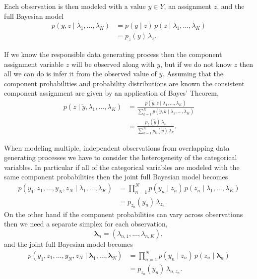 \documentclass[
  letterpaper,
  DIV=11,
  numbers=noendperiod]{scrartcl}
\begin{document}
Each observation is then modeled with a value \(y \in Y\), an assignment
\(z\), and the full Bayesian model \begin{align*}
p(y, z \mid \lambda_{1}, \ldots, \lambda_{K})
&=
p(y \mid z) \, p(z \mid \lambda_{1}, \ldots, \lambda_{K})
\\
&=
p_{z}(y) \, \lambda_{z}.
\end{align*}

If we know the responsible data generating process then the component
assignment variable \(z\) will be observed along with \(y\), but if we
do not know \(z\) then all we can do is infer it from the observed value
of \(y\). Assuming that the component probabilities and probability
distributions are known the consistent component assignment are given by
an application of Bayes' Theorem, \begin{align*}
p(z \mid \tilde{y}, \lambda_{1}, \ldots, \lambda_{K})
&=
\frac{
  p(\tilde{y}, z \mid \lambda_{1}, \ldots, \lambda_{K})
}{
  \sum_{k = 1}^{K} p(\tilde{y}, k \mid \lambda_{1}, \ldots, \lambda_{K})
}
\\
&=
\frac{ p_{z}(\tilde{y}) \, \lambda_{z}}
{ \sum_{k = 1}^{K} p_{k}(\tilde{y}) \, \lambda_{k} }.
\end{align*}

When modeling multiple, independent observations from overlapping data
generating processes we have to consider the heterogeneity of the
categorical variables. In particular if all of the categorical variables
are modeled with the same component probabilities then the joint full
Bayesian model becomes \begin{align*}
p(y_{1}, z_{1}, \ldots, y_{N}, z_{N} \mid
  \lambda_{1}, \ldots, \lambda_{K})
&=
\prod_{n = 1}^{N}
p(y_{n} \mid z_{n}) \, p(z_{n} \mid \lambda_{1}, \ldots, \lambda_{K})
\\
&=
p_{z_{n}}(y_{n}) \, \lambda_{z_{n}}.
\end{align*} On the other hand if the component probabilities can vary
across observations then we need a separate simplex for each
observation, \[
\boldsymbol{\lambda}_{n} = ( \lambda_{n, 1}, \ldots, \lambda_{n, K}),
\] and the joint full Bayesian model becomes \begin{align*}
p(y_{1}, z_{1}, \ldots, y_{N}, z_{N} \mid
  \boldsymbol{\lambda}_{1}, \ldots, \boldsymbol{\lambda}_{N})
&=
\prod_{n = 1}^{N}
p(y_{n} \mid z_{n}) \, p(z_{n} \mid \boldsymbol{\lambda}_{n})
\\
&=
p_{z_{n}}(y_{n}) \, \lambda_{n, z_{n}}.
\end{align*}
\end{document}
